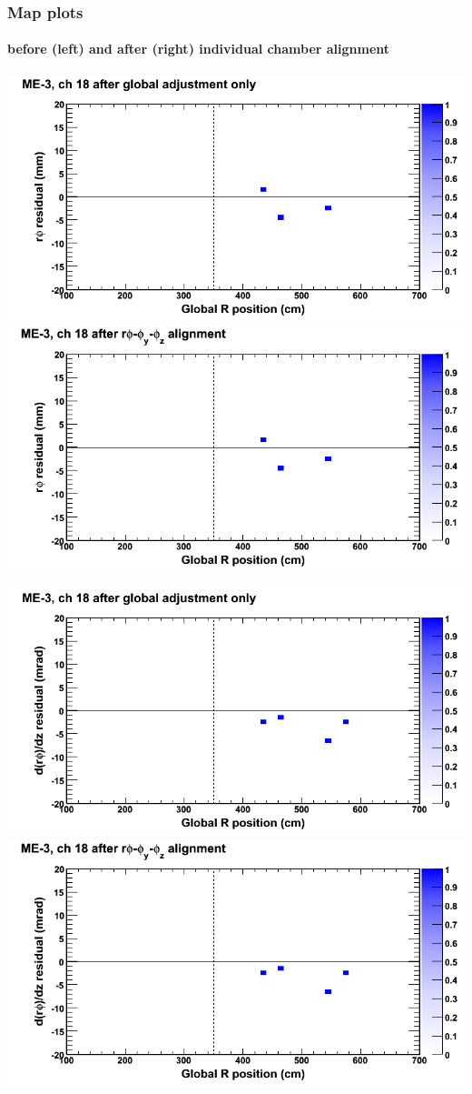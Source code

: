 \documentclass[compress]{beamer}
\begin{document}
\begin{frame}
\frametitle{Map plots}
\framesubtitle{before (left) and after (right) individual chamber alignment}
\includegraphics[width=0.5\linewidth]{ringmapplots_3dof/before_CSCvsr_mem3ch18_x.png} \includegraphics[width=0.5\linewidth]{ringmapplots_3dof/after_CSCvsr_mem3ch18_x.png}

\includegraphics[width=0.5\linewidth]{ringmapplots_3dof/before_CSCvsr_mem3ch18_dxdz.png} \includegraphics[width=0.5\linewidth]{ringmapplots_3dof/after_CSCvsr_mem3ch18_dxdz.png}
\end{frame}
\end{document}
